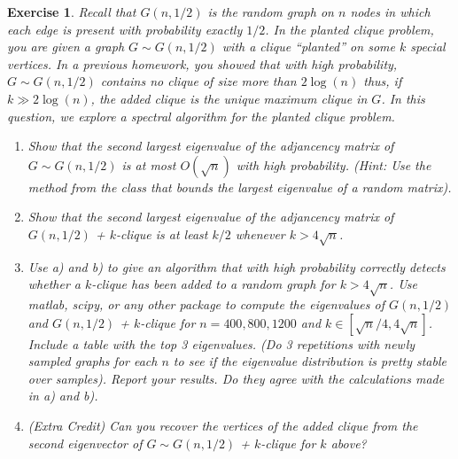 \documentclass[12pt]{article}
\theoremstyle{colon}
\newtheorem{exercise}{Exercise}
\begin{document}
\begin{exercise}
  Recall that $G(n,1/2)$ is the random graph on $n$ nodes in which each edge is present with probability exactly $1/2$. In the planted clique problem, you are given a graph $G \sim G(n,1/2)$ with a clique ``planted'' on some $k$ special vertices. In a previous homework, you showed that with high probability, $G \sim G(n,1/2)$ contains no clique of size more than $2 \log (n)$ thus, if $k \gg 2 \log (n)$, the added clique is the unique maximum clique in $G$. In this question, we explore a spectral algorithm for the planted clique problem.

  \begin{enumerate}[label=\alph*)]
    \item Show that the second largest eigenvalue of the adjancency matrix of $G \sim G(n,1/2)$ is at most $O(\sqrt{n})$ with high probability. (Hint: Use the method from the class that bounds the largest eigenvalue of a random matrix).
    \item Show that the second largest eigenvalue of the adjancency matrix of $G(n,1/2)$ + $k$-clique is at least $k/2$ whenever $k > 4\sqrt{n}$.
    \item Use a) and b) to give an algorithm that with high probability correctly detects whether a $k$-clique has been added to a random graph for $k > 4\sqrt{n}$. Use matlab, scipy, or any other package to compute the eigenvalues of $G(n,1/2)$ and $G(n,1/2)$ + $k$-clique for $n = 400, 800, 1200$ and $k \in [\sqrt{n}/4, 4\sqrt{n}]$. Include a table with the top 3 eigenvalues. (Do 3 repetitions with newly sampled graphs for each $n$ to see if the eigenvalue distribution is pretty stable over samples). Report your results. Do they agree with the calculations made in a) and b).
    \item (Extra Credit) Can you recover the vertices of the added clique from the second eigenvector of $G \sim G(n,1/2)$ + $k$-clique for $k$ above?
  \end{enumerate}
\end{exercise}
\end{document}
